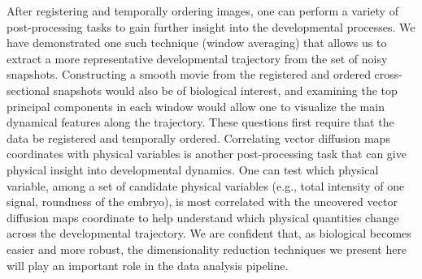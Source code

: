 \documentclass{pnastwo}
\begin{document}
\begin{article}
After registering and temporally ordering images, one can perform a variety of post-processing tasks to gain further insight into the developmental processes.
%
We have demonstrated one such technique (window averaging) that allows us to extract a more representative developmental trajectory from the set of noisy snapshots. 
%
Constructing a smooth movie from the registered and ordered cross-sectional snapshots would also be of biological interest, and
examining the top principal components in each window would allow one to visualize the main dynamical features along the trajectory.
%
These questions first require that the data be registered and temporally ordered.
%
Correlating vector diffusion maps coordinates with physical variables is another post-processing task that can give physical insight into developmental dynamics.
%
One can test which physical variable, among a set of candidate physical variables (e.g., total intensity of one signal, roundness of the embryo), is most correlated with the uncovered vector diffusion maps coordinate to help understand which physical quantities change across the developmental trajectory.
%
We are confident that, as biological becomes easier and more robust, the dimensionality reduction techniques we present here will play an important role in the data analysis pipeline. 


 




\end{article}
\end{document}

